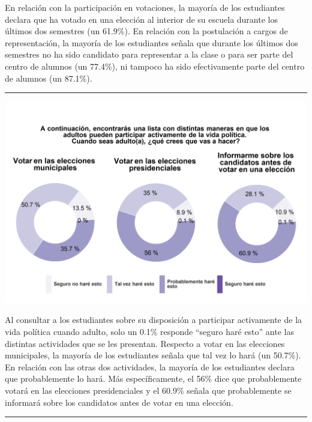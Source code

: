 \documentclass[
  14pt,
]{book}
\let\origfigure\figure
\let\endorigfigure\endfigure
\renewenvironment{figure}[1][2] {
  \expandafter\origfigure\expandafter[H]
} {
  \endorigfigure
}
\begin{document}
En relación con la participación en votaciones, la mayoría de los estudiantes declara que ha votado en una elección al interior de su escuela durante los últimos dos semestres (un 61.9\%). En relación con la postulación a cargos de representación, la mayoría de los estudiantes señala que durante los últimos dos semestres no ha sido candidato para representar a la clase o para ser parte del centro de alumnos (un 77.4\%), ni tampoco ha sido efectivamente parte del centro de alumnos (un 87.1\%).

\begin{center}\rule{0.5\linewidth}{0.5pt}\end{center}

\begin{figure}[!ht]

{\centering \includegraphics[width=0.8\linewidth,]{images/graph_partform_fut} 

}

\caption{Participación formal cuando sea adulto(a)}\label{fig:unnamed-chunk-53}
\end{figure}

Al consultar a los estudiantes sobre su disposición a participar activamente de la vida política cuando adulto, solo un 0.1\% responde ``seguro haré esto'' ante las distintas actividades que se les presentan. Respecto a votar en las elecciones municipales, la mayoría de los estudiantes señala que tal vez lo hará (un 50.7\%). En relación con las otras dos actividades, la mayoría de los estudiantes declara que probablemente lo hará. Más específicamente, el 56\% dice que probablemente votará en las elecciones presidenciales y el 60.9\% señala que probablemente se informará sobre los candidatos antes de votar en una elección.

\begin{center}\rule{0.5\linewidth}{0.5pt}\end{center}
\end{document}
